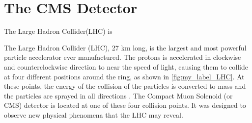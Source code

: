 \chapter{\label{CMS}The CMS Detector}


The Large Hadron Collider(LHC) is 








The  Large Hadron Collider (LHC), 27 km long, is the largest and most powerful particle accelerator ever manufactured. The protons is accelerated in clockwise and counterclockwise direction to near the speed of light, causing them to collide at four different positions around the ring, as shown in \autoref{fig:my_label_LHC}. At these points, the energy of the collision of the particles is converted to mass and the particles are sprayed in all directions \cite{CMS_1}. The Compact Muon Solenoid (or CMS) detector is located at one of these four collision points. It was designed to observe  new physical phenomena that the LHC may reveal.



